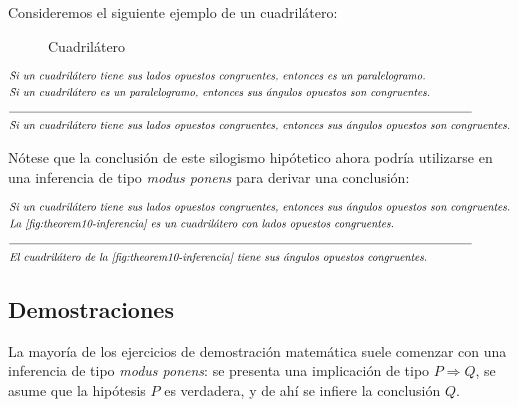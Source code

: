 Consideremos el siguiente ejemplo de un cuadrilátero:

\begin{figure}[!h]
    \centering
    
    \caption{Cuadrilátero}
    \label{fig:theorem10-inferencia}
\end{figure}

\begin{equation*}
    \begin{split}
        & \textit{Si un cuadrilátero tiene sus lados opuestos congruentes, entonces es un paralelogramo.} \\
        & \textit{Si un cuadrilátero es un paralelogramo, entonces sus ángulos opuestos son congruentes.} \\
        & \text{\noindent\rule{42em}{0.4pt}} \\
        & \textit{Si un cuadrilátero tiene sus lados opuestos congruentes, entonces sus ángulos opuestos son congruentes.}
    \end{split}
\end{equation*}

Nótese que la conclusión de este silogismo hipótetico ahora podría utilizarse en una inferencia de tipo \textit{modus ponens} para derivar una conclusión:

\begin{equation*}
    \begin{split}
        & \textit{Si un cuadrilátero tiene sus lados opuestos congruentes, entonces sus ángulos opuestos son congruentes.} \\
        & \textit{La \cref{fig:theorem10-inferencia} es un cuadrilátero con lados opuestos congruentes.} \\
        & \text{\noindent\rule{42em}{0.4pt}} \\
        & \textit{El cuadrilátero de la \cref{fig:theorem10-inferencia} tiene sus ángulos opuestos congruentes.}
    \end{split}
\end{equation*}

\subsection{Demostraciones}

La mayoría de los ejercicios de demostración matemática suele comenzar con una inferencia de tipo \textit{modus ponens}: se presenta una implicación de tipo $P \Rightarrow Q$, se asume que la hipótesis $P$ es verdadera, y de ahí  se infiere la conclusión $Q$.

